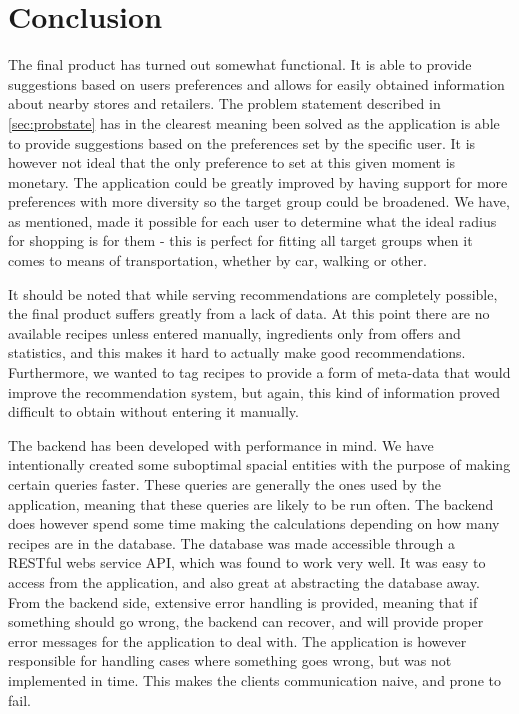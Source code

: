 \chapter{Conclusion}
\label{chap:conc}

The final product has turned out somewhat functional. It is able to provide suggestions based on users preferences and allows for easily obtained information about nearby stores and retailers. The problem statement described in \ref{sec:probstate} has in the clearest meaning been solved as the application is able to provide suggestions based on the preferences set by the specific user. It is however not ideal that the only preference to set at this given moment is monetary. The application could be greatly improved by having support for more preferences with more diversity so the target group could be broadened. We have, as mentioned, made it possible for each user to determine what the ideal radius for shopping is for them - this is perfect for fitting all target groups when it comes to means of transportation, whether by car, walking or other.

It should be noted that while serving recommendations are completely possible, the final product suffers greatly from a lack of data. At this point there are no available recipes unless entered manually, ingredients only from offers and statistics, and this makes it hard to actually make good recommendations.
Furthermore, we wanted to tag recipes to provide a form of meta-data that would improve the recommendation system, but again, this kind of information proved difficult to obtain without entering it manually.

The backend has been developed with performance in mind. We have intentionally created some suboptimal spacial entities with the purpose of making certain queries faster. These queries are generally the ones used by the application, meaning that these queries are likely to be run often. The backend does however spend some time making the calculations depending on how many recipes are in the database. The database was made accessible through a RESTful webs service API, which was found to work very well. It was easy to access from the application, and also great at abstracting the database away. From the backend side, extensive error handling is provided, meaning that if something should go wrong, the backend can recover, and will provide proper error messages for the application to deal with. The application is however responsible for handling cases where something goes wrong, but was not implemented in time. This makes the clients communication naive, and prone to fail.

